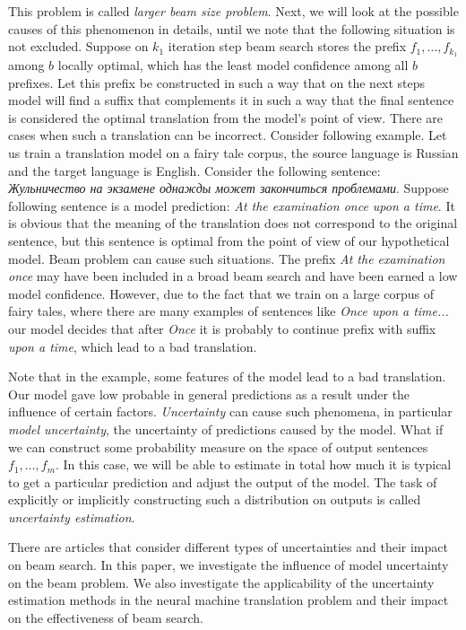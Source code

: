 \documentclass[a4paper,14pt]{extarticle}
\begin{document}
	This problem is called \textit{larger beam size problem}. Next, we will look at the possible causes of this phenomenon in details, until we note that the following situation is not excluded. Suppose on $k_1$ iteration step beam search stores the prefix $f_1, \dots, f_{k_1}$ among $b$ locally optimal, which has the least model confidence among all $b$ prefixes. Let this prefix be constructed in such a way that on the next steps model will find a suffix that complements it in such a way that the final sentence is considered the optimal translation from the model's point of view. There are cases when such a translation can be incorrect. Consider following example. Let us train a translation model on a fairy tale corpus, the source language is Russian and the target language is English. Consider the following sentence: \textit{Жульничество на экзамене однажды может закончиться проблемами}. Suppose following sentence is a model prediction: \textit{At the examination once upon a time}. It is obvious that the meaning of the translation does not correspond to the original sentence, but this sentence is optimal from the point of view of our hypothetical model. Beam problem can cause such situations. The prefix \textit{At the examination once} may have been included in a broad beam search and have been earned a low model confidence. However, due to the fact that we train on a large corpus of fairy tales, where there are many examples of sentences like \textit{Once upon a time...} our model decides that after \textit{Once} it is probably to continue prefix with suffix \textit{upon a time}, which lead to a bad translation.
	
	Note that in the example, some features of the model lead to a bad translation. Our model gave low probable in general predictions as a result under the influence of certain factors. \textit{Uncertainty} can cause such phenomena, in particular \textit{model uncertainty}, the uncertainty of predictions caused by the model. What if we can construct some probability measure on the space of output sentences $f_1, \dots, f_m$. In this case, we will be able to estimate in total how much it is typical to get a particular prediction and adjust the output of the model. The task of explicitly or implicitly constructing such a distribution on outputs is called \textit{uncertainty estimation}.
	
	There are articles that consider different types of uncertainties and their impact on beam search. In this paper, we investigate the influence of model uncertainty on the beam problem. We also investigate the applicability of the uncertainty estimation methods in the neural machine translation problem and their impact on the effectiveness of beam search.
	
\end{document}
